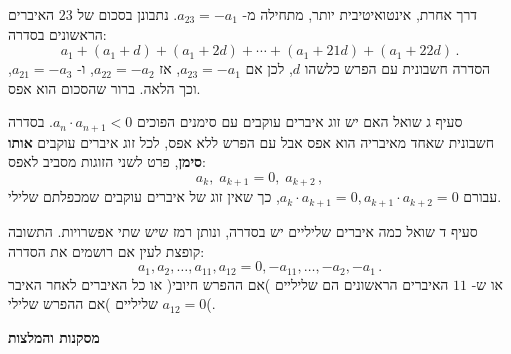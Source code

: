 \documentclass[12pt,a4paper]{article}
\begin{document}
דרך אחרת, אינטואיטיבית יותר, מתחילה מ-%
$a_{23}=-a_1$.
נתבונן בסכום של
$23$
האיברים הראשונים בסדרה:
\[
a_1 + (a_1+d) + (a_1+2d) + \cdots + (a_1+21d) + (a_1+22d)\,.
\]
הסדרה חשבונית עם הפרש כלשהו
$d$,
לכן אם
$a_{23} = -a_1$,
אז
$a_{22} = -a_2$,
ו-%
$a_{21} = -a_3$,
וכך הלאה. ברור שהסכום הוא אפס. 

סעיף ג שואל האם יש זוג איברים עוקבים עם סימנים הפוכים
$a_n\cdot a_{n+1} < 0$.
בסדרה חשבונית שאחד מאיבריה הוא אפס אבל עם הפרש ללא אפס, לכל זוג איברים עוקבים
\textbf{אותו סימן},
פרט לשני הזוגות מסביב לאפס:
\[
a_k,\; a_{k+1}=0,\; a_{k+2}\,,
\]
עבורם
$a_k\cdot a_{k+1} = 0, a_{k+1}\cdot a_{k+2} = 0$,
כך שאין זוג של איברים עוקבים שמכפלתם שלילי.

סעיף ד שואל כמה איברים שליליים יש בסדרה, ונותן רמז שיש שתי אפשרויות. התשובה קופצת לעין אם רושמים את הסדרה:
\[
a_1, a_2, \ldots, a_{11}, a_{12}=0, -a_{11}, \ldots, -a_2, -a_1\,.
\]
או ש-%
$11$
האיברים הראשונים הם שליליים )אם ההפרש חיובי( או כל האיברים לאחר האיבר
$a_{12}=0$
שליליים )אם ההפרש שלילי(.


\begin{center}
\textbf{מסקנות והמלצות}
\end{center}
\end{document}

